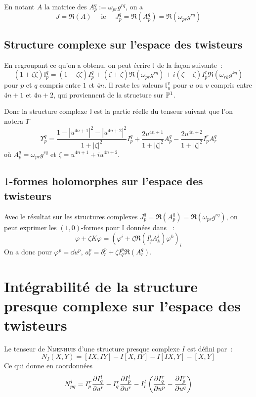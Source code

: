 \documentclass[a4paper,draft]{amsart}
\begin{document}
En notant $A$ la matrice des $A_p^q := \omega_{pr}g^{rq}$, on a
\[
J = \Re(A) \quad \text{ ie } \quad J_p^q = \Re(A_p^q) = \Re(\omega_{pr}g^{rq})
\]

\subsection{Structure complexe sur l'espace des twisteurs}
En regroupant ce qu'on a obtenu, on peut écrire $\mathbb{I}$ de la façon suivante~:
\[
\left(1+\zeta \bar{\zeta}\right)\mathbb{I}_p^q = \left(1-\zeta \bar{\zeta}\right)I_p^q + \left(\zeta + \bar{\zeta}\right)\Re(\omega_{pr}g^{rq}) + i\left(\zeta - \bar{\zeta}\right)I_p^r\Re(\omega_{rk}g^{kq})
\]
pour $p$ et $q$ compris entre $1$ et $4n$. Il reste les valeurs $\mathbb{I}_u^v$ pour $u$ ou $v$ compris entre $4n+1$ et $4n+2$, qui proviennent de la structure sur $\mathbb{P}^1$.

Donc la structure complexe $\mathbb{I}$ est la partie réelle du tenseur suivant que l'on notera $\Upsilon$
\[
\Upsilon_p^q = 
\dfrac{1-|u^{4n+1}|^2-|u^{4n+2}|^2}{1+|\zeta|^2}
I_p^q
+
\dfrac{2u^{4n+1}}{1+|\zeta|^2}
A_p^q
-
\dfrac{2u^{4n+2}}{1+|\zeta|^2}
I_p^rA_r^q
\]
où $A_p^q = \omega_{pr}g^{rq}$ et $\zeta = u^{4n+1}+iu^{4n+2}$.
\todo{}

\subsection{$1$-formes holomorphes sur l'espace des twisteurs}
Avec le résultat sur les structures complexes $J_p^q = \Re(A_p^q) = \Re(\omega_{pr}g^{rq})$, on peut exprimer les $(1,0)$-formes pour $\mathbb{I}$ données dans \cite{Hitchin-Karlhede}~:
\[
\varphi + \zeta K\varphi = \left( 
\varphi^i + \zeta \Re(I_j^i A_k^j)\varphi^k
\right)_i
\]
On a donc pour $\varphi^p = \dd u^p$, $a_r^p = \delta_r^p + \zeta I_q^p\Re(A_r^q)$.

\appendix
\section[Intégrabilité de la structure presque complexe sur $Z$]{Intégrabilité de la structure presque complexe sur l'espace des twisteurs}
Le tenseur de \textsc{Nijenhuis} d'une structure presque complexe $I$ est défini par~:
\[
N_I(X,Y) = [ I X , I Y ] - I [ X , I Y ] - I [ I X , Y ] - [ X , Y ]
\]
Ce qui donne en coordonnées
\[
N_{pq}^l = I_p^r \dfrac{\partial{I_q^l}}{\partial{u^r}} - I_q^r \dfrac{\partial{I_p^l}}{\partial{u^r}} - I_r^l\left( \dfrac{\partial{I^r_q}}{\partial{u^p}} - \dfrac{\partial{I^r_p}}{\partial{u^q}}
\right)
\]



\end{document}
